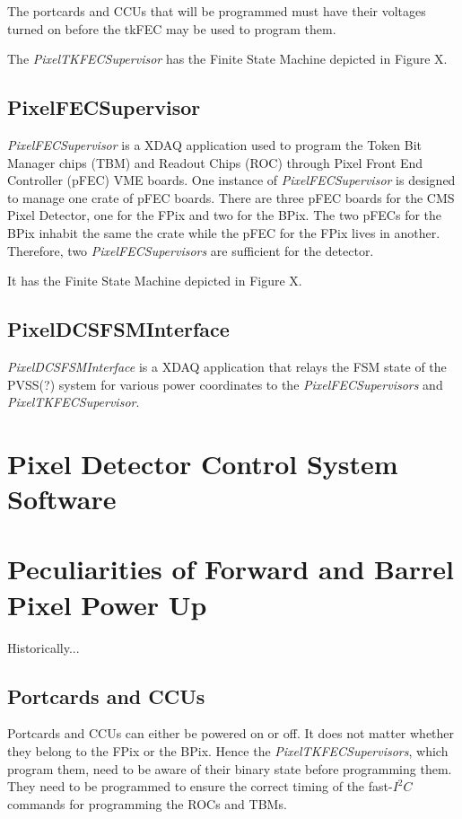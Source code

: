 \documentclass{cmspaper}
\begin{document}
The portcards and CCUs that will be programmed must have their voltages turned on before the tkFEC may be used to program them.

The \textit{PixelTKFECSupervisor} has the Finite State Machine depicted in Figure {X}.

\subsection{PixelFECSupervisor}

\textit{PixelFECSupervisor} is a XDAQ application used to program the Token Bit Manager chips (TBM) and Readout Chips (ROC) through Pixel Front End Controller (pFEC) VME boards. One instance of \textit{PixelFECSupervisor} is designed to manage one crate of pFEC boards. There are three pFEC boards for the CMS Pixel Detector, one for the FPix and two for the BPix. The two pFECs for the BPix inhabit the same the crate while the pFEC for the FPix lives in another. Therefore, two \textit{PixelFECSupervisors} are sufficient for the detector.

It has the Finite State Machine depicted in Figure {X}.

\subsection{PixelDCSFSMInterface}

\textit{PixelDCSFSMInterface} is a XDAQ application that relays the FSM state of the PVSS(?) system for various power coordinates to the \textit{PixelFECSupervisors} and \textit{PixelTKFECSupervisor}.


\section{Pixel Detector Control System Software} \label{sect:dcs}

\section{Peculiarities of Forward and Barrel Pixel Power Up} \label{sect:peculiarities}

Historically...

\subsection{Portcards and CCUs}

Portcards and CCUs can either be powered on or off. It does not matter whether they belong to the FPix or the BPix. Hence the \textit{PixelTKFECSupervisors}, which program them, need to be aware of their binary state before programming them. They need to be programmed to ensure the correct timing of the fast-$I^{2}C$ commands for programming the ROCs and TBMs.
\end{document}
